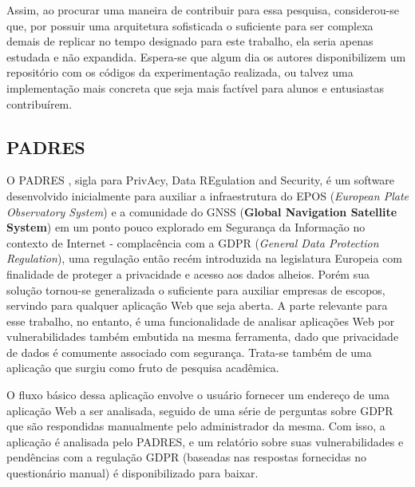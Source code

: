 Assim, ao procurar uma maneira de contribuir para essa pesquisa, considerou-se que, por possuir uma arquitetura sofisticada o suficiente para ser complexa demais de replicar no tempo designado para este trabalho, ela seria apenas estudada e não expandida. Espera-se que algum dia os autores disponibilizem um repositório com os códigos da experimentação realizada, ou talvez uma implementação mais concreta que seja mais factível para alunos e entusiastas contribuírem.

\subsection{PADRES}

O PADRES \cite{pereira_padres_2022}, sigla para PrivAcy, Data REgulation and Security, é um software desenvolvido inicialmente para auxiliar a infraestrutura do EPOS (\textit{European Plate Observatory System}) e a comunidade do GNSS (\textbf{Global Navigation Satellite System}) em um ponto pouco explorado em Segurança da Informação no contexto de Internet - complacência com a GDPR (\textit{General Data Protection Regulation}), uma regulação então recém introduzida na legislatura Europeia com finalidade de proteger a privacidade e acesso aos dados alheios. Porém sua solução tornou-se generalizada o suficiente para auxiliar empresas de escopos, servindo para qualquer aplicação Web que seja aberta. A parte relevante para esse trabalho, no entanto, é uma funcionalidade de analisar aplicações Web por vulnerabilidades também embutida na mesma ferramenta, dado que privacidade de dados é comumente associado com segurança. Trata-se também de uma aplicação que surgiu como fruto de pesquisa acadêmica.

O fluxo básico dessa aplicação envolve o usuário fornecer um endereço de uma aplicação Web a ser analisada, seguido de uma série de perguntas sobre GDPR que são respondidas manualmente pelo administrador da mesma. Com isso, a aplicação é analisada pelo PADRES, e um relatório sobre suas vulnerabilidades e pendências com a regulação GDPR (baseadas nas respostas fornecidas no questionário manual) é disponibilizado para baixar. 

